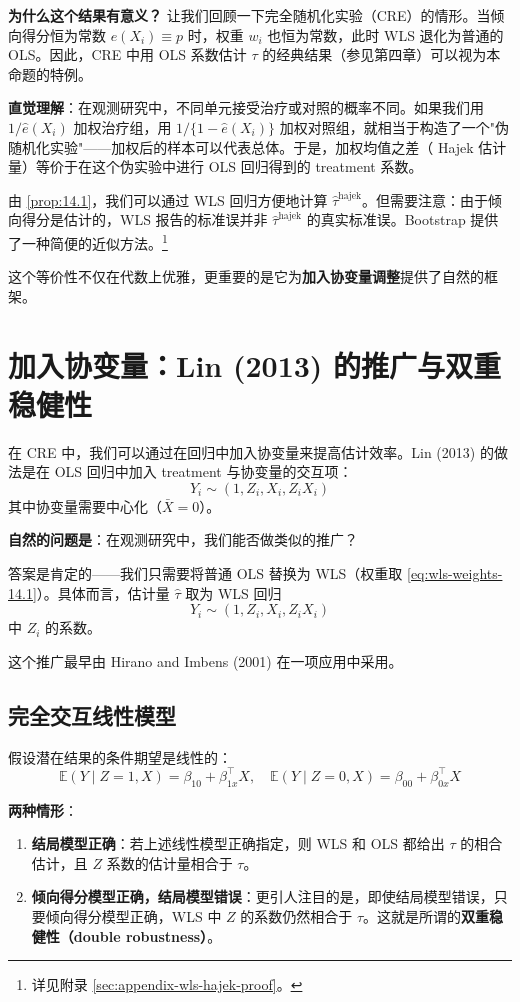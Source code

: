 \textbf{为什么这个结果有意义？} 让我们回顾一下完全随机化实验（CRE）的情形。当倾向得分恒为常数 $e(X_i) \equiv p$ 时，权重 $w_i$ 也恒为常数，此时 WLS 退化为普通的 OLS。因此，CRE 中用 OLS 系数估计 $\tau$ 的经典结果（参见第四章）可以视为本命题的特例。

\textbf{直觉理解}：在观测研究中，不同单元接受治疗或对照的概率不同。如果我们用 $1/\hat{e}(X_i)$ 加权治疗组，用 $1/\{1-\hat{e}(X_i)\}$ 加权对照组，就相当于构造了一个"伪随机化实验"——加权后的样本可以代表总体。于是，加权均值之差（ Hajek 估计量）等价于在这个伪实验中进行 OLS 回归得到的 treatment 系数。

由 \cref{prop:14.1}，我们可以通过 WLS 回归方便地计算 $\hat{\tau}^{\text{hajek}}$。但需要注意：由于倾向得分是估计的，WLS 报告的标准误并非 $\hat{\tau}^{\text{hajek}}$ 的真实标准误。Bootstrap 提供了一种简便的近似方法。\footnote{详见附录 \cref{sec:appendix-wls-hajek-proof}。}

这个等价性不仅在代数上优雅，更重要的是它为\textbf{加入协变量调整}提供了自然的框架。

\section{加入协变量：Lin (2013) 的推广与双重稳健性}\label{sec:14-3}

在 CRE 中，我们可以通过在回归中加入协变量来提高估计效率。Lin (2013) 的做法是在 OLS 回归中加入 treatment 与协变量的交互项：
\[
Y_i \sim (1, Z_i, X_i, Z_i X_i)
\]
其中协变量需要中心化（$\bar{X}=0$）。

\textbf{自然的问题是}：在观测研究中，我们能否做类似的推广？

答案是肯定的——我们只需要将普通 OLS 替换为 WLS（权重取 \cref{eq:wls-weights-14.1}）。具体而言，估计量 $\hat{\tau}$ 取为 WLS 回归
\[
Y_i \sim (1, Z_i, X_i, Z_i X_i)
\]
中 $Z_i$ 的系数。

这个推广最早由 Hirano and Imbens (2001) 在一项应用中采用。

\subsection{完全交互线性模型}\label{sec:14-3-1}

假设潜在结果的条件期望是线性的：
\[
\mathbb{E}(Y \mid Z=1, X) = \beta_{10} + \beta_{1x}^\top X, \quad
\mathbb{E}(Y \mid Z=0, X) = \beta_{00} + \beta_{0x}^\top X
\]

\textbf{两种情形}：

\begin{enumerate}
  \item \textbf{结局模型正确}：若上述线性模型正确指定，则 WLS 和 OLS 都给出 $\tau$ 的相合估计，且 $Z$ 系数的估计量相合于 $\tau$。

  \item \textbf{倾向得分模型正确，结局模型错误}：更引人注目的是，即使结局模型错误，只要倾向得分模型正确，WLS 中 $Z$ 的系数仍然相合于 $\tau$。这就是所谓的\textbf{双重稳健性（double robustness）}。
\end{enumerate}

